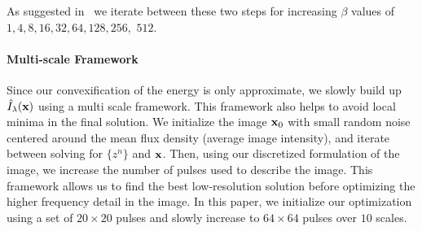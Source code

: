 {{{{As suggested in~\cite{zoran2011learning} we iterate between these two steps for increasing $\beta$ values of $1, 4, 8, 16, 32, 64, 128, 256,$ $512$.  


\paragraph{Multi-scale Framework}
Since our convexification of the energy is only approximate, we slowly build up $\hat{I}_{\lambda}({\bf x})$ using a multi scale framework. This framework also helps to avoid local minima in the final solution. We initialize the image ${\bf x}_0$ with small random noise centered around the mean flux density (average image intensity), and iterate between solving for $ \{ z^n \}$ and ${\bf x}$. Then, using our discretized formulation of the image, we increase the number of pulses used to describe the image. This framework allows us to find the best low-resolution solution before optimizing the higher frequency detail in the image. In this paper, we initialize our optimization using a set of $20 \times 20$ pulses and slowly increase to $64 \times 64$ pulses over $10$ scales.






}}}}

